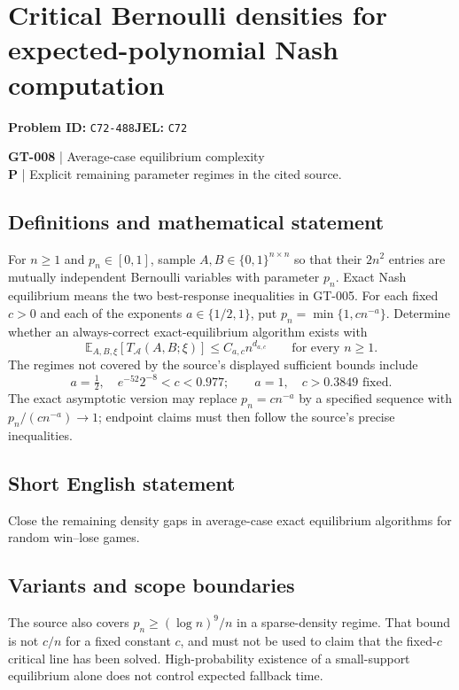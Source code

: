 \documentclass[11pt,a4paper]{article}
\begin{document}
\section*{Critical Bernoulli densities for expected-polynomial Nash computation}
\textbf{Problem ID:} \texttt{C72-488}\quad \textbf{JEL:} \texttt{C72}\par
\label{problem:OP-0138}
\label{game:GT-008}
{\sffamily\small\color{muted}
\textbf{GT-008} | Average-case equilibrium complexity\\
\textbf{P} | Explicit remaining parameter regimes in the cited source.
\par}
\subsection*{Definitions and mathematical statement}
For $n\geq1$ and $p_n\in[0,1]$, sample $A,B\in\{0,1\}^{n\times n}$ so that their $2n^2$ entries are mutually independent Bernoulli variables with parameter $p_n$. Exact Nash equilibrium means the two best-response inequalities in GT-005. For each fixed $c>0$ and each of the exponents $a\in\{1/2,1\}$, put $p_n=\min\{1,cn^{-a}\}$. Determine whether an always-correct exact-equilibrium algorithm exists with
\[
 \mathbb E_{A,B,\xi}[T_{\mathcal A}(A,B;\xi)]\leq C_{a,c}n^{d_{a,c}}
 \qquad\text{for every }n\geq1.
\]
The regimes not covered by the source's displayed sufficient bounds include
\[
 a=\tfrac12,\quad e^{-52}2^{-8}<c<0.977;
 \qquad a=1,\quad c>0.3849\text{ fixed}.
\]
The exact asymptotic version may replace $p_n=cn^{-a}$ by a specified sequence with $p_n/(cn^{-a})\to1$; endpoint claims must then follow the source's precise inequalities.
\subsection*{Short English statement}
Close the remaining density gaps in average-case exact equilibrium algorithms for random win--lose games.
\subsection*{Variants and scope boundaries}
The source also covers $p_n\geq(\log n)^9/n$ in a sparse-density regime. That bound is not $c/n$ for a fixed constant $c$, and must not be used to claim that the fixed-$c$ critical line has been solved. High-probability existence of a small-support equilibrium alone does not control expected fallback time.
\end{document}
